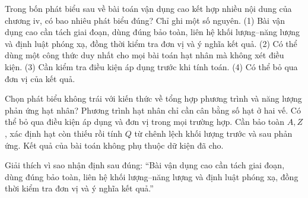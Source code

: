 \begin{ex}
Trong bốn phát biểu sau về bài toán vận dụng cao kết hợp nhiều nội dung của chương iv, có bao nhiêu phát biểu đúng? Chỉ ghi một số nguyên. (1) Bài vận dụng cao cần tách giai đoạn, dùng đúng bảo toàn, liên hệ khối lượng–năng lượng và định luật phóng xạ, đồng thời kiểm tra đơn vị và ý nghĩa kết quả. (2) Có thể dùng một công thức duy nhất cho mọi bài toán hạt nhân mà không xét điều kiện. (3) Cần kiểm tra điều kiện áp dụng trước khi tính toán. (4) Có thể bỏ qua đơn vị của kết quả.
\end{ex}

\begin{ex}
Chọn phát biểu không trái với kiến thức về tổng hợp phương trình và năng lượng phản ứng hạt nhân?
\choice
{Phương trình hạt nhân chỉ cần cân bằng số hạt ở hai vế.}
{Có thể bỏ qua điều kiện áp dụng và đơn vị trong mọi trường hợp.}
{\True Cần bảo toàn $A,Z$, xác định hạt còn thiếu rồi tính $Q$ từ chênh lệch khối lượng trước và sau phản ứng.}
{Kết quả của bài toán không phụ thuộc dữ kiện đã cho.}
\end{ex}

\begin{bt}
Giải thích vì sao nhận định sau đúng: “Bài vận dụng cao cần tách giai đoạn, dùng đúng bảo toàn, liên hệ khối lượng–năng lượng và định luật phóng xạ, đồng thời kiểm tra đơn vị và ý nghĩa kết quả.”
\end{bt}


